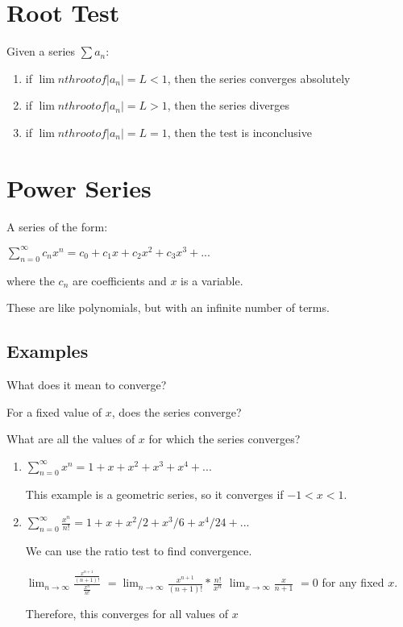 \documentclass{article}
\begin{document}
\section{Root Test}

Given a series $\sum a_n$: 

\begin{enumerate}
    \item if $\lim nth root of |a_n| = L < 1$, then the series converges absolutely 
    \item if $\lim nth root of |a_n| = L > 1$, then the series diverges
    \item if $\lim nth root of |a_n| = L = 1$, then the test is inconclusive
\end{enumerate}

\section{Power Series}

A series of the form:

$\sum_{n=0}^{\infty} c_nx^n = c_0 + c_1x + c_2x^2 + c_3x^3 + ...$

where the $c_n$ are coefficients and $x$ is a variable.

These are like polynomials, but with an infinite number of terms. 

\subsection{Examples}

What does it mean to converge? 

    For a fixed value of $x$, does the series converge?
    
    What are all the values of $x$ for which the series converges?
    
\begin{enumerate}
    \item $\sum_{n=0}^{\infty} x^n = 1 + x + x^2 + x^3 + x^4 + ...$
    
    This example is a geometric series, so it converges if $-1<x<1$.

    \item $\sum_{n=0}^{\infty}\frac{x^n}{n!} = 1 + x + x^2/2 + x^3/6 + x^4/24 + ...$

    We can use the ratio test to find convergence.
    
    $\lim_{n\to\infty} \frac{\frac{x^{n+1}}{(n+1)!}}{\frac{x^n}{n!}}$
    $=\lim_{n\to\infty} \frac{x^{n+1}}{(n+1)!}*\frac{n!}{x^n} $
    $\lim_{x\to\infty}\frac{x}{n+1}$
    $= 0$ for any fixed $x$.
    
    Therefore, this converges for all values of $x$
\end{enumerate}
\end{document}
